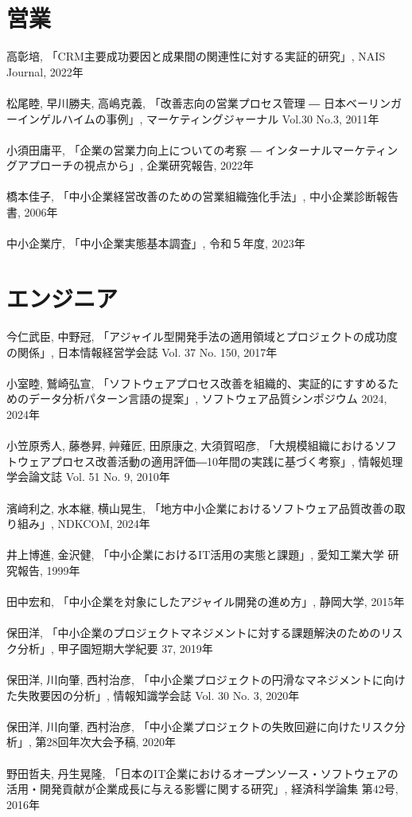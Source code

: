 \clearpage
\section*{営業}
高彰培, 「CRM主要成功要因と成果間の関連性に対する実証的研究」, NAIS Journal, 2022年
\\\\
松尾睦, 早川勝夫, 高嶋克義, 「改善志向の営業プロセス管理 ― 日本ベーリンガーインゲルハイムの事例」, マーケティングジャーナル Vol.30 No.3, 2011年
\\\\
小須田庸平, 「企業の営業力向上についての考察 ― インターナルマーケティングアプローチの視点から」, 企業研究報告, 2022年
\\\\
橋本佳子, 「中小企業経営改善のための営業組織強化手法」, 中小企業診断報告書, 2006年
\\\\
中小企業庁, 「中小企業実態基本調査」, 令和５年度, 2023年

\clearpage
\section*{エンジニア}
今仁武臣, 中野冠, 「アジャイル型開発手法の適用領域とプロジェクトの成功度の関係」, 日本情報経営学会誌 Vol. 37 No. 150, 2017年
\\\\
小室睦, 鷲崎弘宣, 「ソフトウェアプロセス改善を組織的、実証的にすすめるためのデータ分析パターン言語の提案」, ソフトウェア品質シンポジウム 2024, 2024年
\\\\
小笠原秀人, 藤巻昇, 艸薙匠, 田原康之, 大須賀昭彦, 「大規模組織におけるソフトウェアプロセス改善活動の適用評価―10年間の実践に基づく考察」, 情報処理学会論文誌 Vol. 51 No. 9, 2010年
\\\\
濱﨑利之, 水本継, 横山晃生, 「地方中小企業におけるソフトウェア品質改善の取り組み」, NDKCOM, 2024年
\\\\
井上博進, 金沢健, 「中小企業におけるIT活用の実態と課題」, 愛知工業大学 研究報告, 1999年
\\\\
田中宏和, 「中小企業を対象にしたアジャイル開発の進め方」, 静岡大学, 2015年
\\\\
保田洋, 「中小企業のプロジェクトマネジメントに対する課題解決のためのリスク分析」, 甲子園短期大学紀要 37, 2019年
\\\\
保田洋, 川向肇, 西村治彦, 「中小企業プロジェクトの円滑なマネジメントに向けた失敗要因の分析」, 情報知識学会誌 Vol. 30 No. 3, 2020年
\\\\
保田洋, 川向肇, 西村治彦, 「中小企業プロジェクトの失敗回避に向けたリスク分析」, 第28回年次大会予稿, 2020年
\\\\
野田哲夫, 丹生晃隆, 「日本のIT企業におけるオープンソース・ソフトウェアの活用・開発貢献が企業成長に与える影響に関する研究」, 経済科学論集 第42号, 2016年
